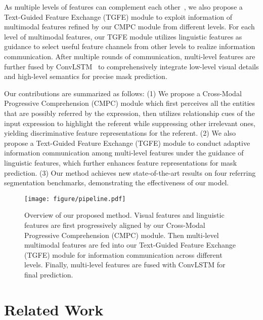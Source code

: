 \documentclass[10pt,twocolumn,letterpaper]{article}
\begin{document}
As multiple levels of features can complement each other~\cite{li2018referring}\cite{ye2019cross}\cite{chen2019see}, 
we also propose a Text-Guided Feature Exchange (TGFE) module to exploit 
information of multimodal features refined by our CMPC module from different levels. 
For each level of multimodal features, our TGFE module utilizes linguistic features 
as guidance to select useful feature channels from other levels to realize information 
communication. After multiple rounds of communication, multi-level features are further 
fused by ConvLSTM~\cite{xingjian2015convolutional} to comprehensively integrate 
low-level visual details and high-level semantics for precise mask prediction.

Our contributions are summarized as follows: 
(1) We propose a Cross-Modal Progressive Comprehension (CMPC) module which first 
perceives all the entities that are possibly referred by the expression, then 
utilizes relationship cues of the input expression to highlight the referent while 
suppressing other irrelevant ones, yielding discriminative feature representations for the referent. 
(2) We also propose a Text-Guided Feature Exchange (TGFE) module to conduct 
adaptive information communication among multi-level features under the guidance of 
linguistic features, which further enhances feature representations for mask prediction. 
(3) Our method achieves new state-of-the-art results on four referring segmentation benchmarks, 
demonstrating the effectiveness of our model.

\begin{figure*}[t]
   \begin{center}
      \texttt{[image: figure/pipeline.pdf]}
   \end{center}
      \caption{Overview of our proposed method. Visual features and linguistic features are first progressively aligned by 
      our Cross-Modal Progressive Comprehension (CMPC) module. Then multi-level multimodal features are fed into our Text-Guided Feature Exchange (TGFE) module for information communication across different levels. Finally, multi-level features are fused with ConvLSTM for final prediction.}
   \label{fig:pipeline}
\end{figure*}

\vspace{-1mm}
\section{Related Work}
\vspace{-1mm}
\end{document}
